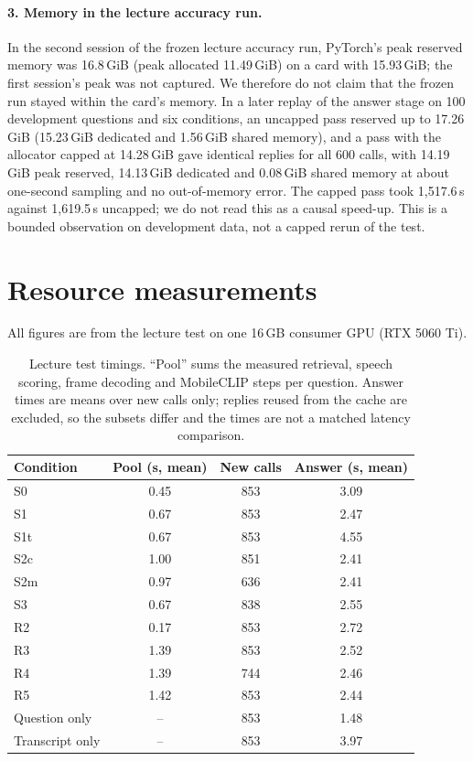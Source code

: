 \paragraph{3. Memory in the lecture accuracy run.}
In the second session of the frozen lecture accuracy run, PyTorch's peak reserved memory was 16.8\,GiB (peak allocated 11.49\,GiB) on a card with 15.93\,GiB; the first session's peak was not captured.
We therefore do not claim that the frozen run stayed within the card's memory.
In a later replay of the answer stage on 100 development questions and six conditions, an uncapped pass reserved up to 17.26\,GiB (15.23\,GiB dedicated and 1.56\,GiB shared memory), and a pass with the allocator capped at 14.28\,GiB gave identical replies for all 600 calls, with 14.19\,GiB peak reserved, 14.13\,GiB dedicated and 0.08\,GiB shared memory at about one-second sampling and no out-of-memory error.
The capped pass took 1,517.6\,s against 1,619.5\,s uncapped; we do not read this as a causal speed-up.
This is a bounded observation on development data, not a capped rerun of the test.

\section{Resource measurements}
\label{sec:s-cost}
All figures are from the lecture test on one 16\,GB consumer GPU (RTX 5060 Ti).

\begin{table}[t]
\centering
\small
\setlength{\tabcolsep}{4pt}
\begin{tabular}{@{}lccc@{}}
\toprule
Condition & Pool (s, mean) & New calls & Answer (s, mean) \\
\midrule
S0 & 0.45 & 853 & 3.09 \\
S1 & 0.67 & 853 & 2.47 \\
S1t & 0.67 & 853 & 4.55 \\
S2c & 1.00 & 851 & 2.41 \\
S2m & 0.97 & 636 & 2.41 \\
S3 & 0.67 & 838 & 2.55 \\
R2 & 0.17 & 853 & 2.72 \\
R3 & 1.39 & 853 & 2.52 \\
R4 & 1.39 & 744 & 2.46 \\
R5 & 1.42 & 853 & 2.44 \\
Question only & -- & 853 & 1.48 \\
Transcript only & -- & 853 & 3.97 \\
\bottomrule
\end{tabular}
\caption{Lecture test timings. ``Pool'' sums the measured retrieval, speech scoring, frame decoding and MobileCLIP steps per question. Answer times are means over new calls only; replies reused from the cache are excluded, so the subsets differ and the times are not a matched latency comparison.}
\label{tab:s-cost}
\end{table}

